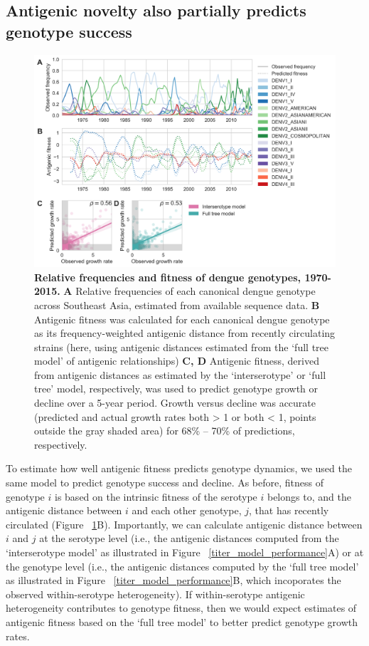\documentclass[11pt,oneside,letterpaper]{article}
\begin{document}
\subsection{Antigenic novelty also partially predicts genotype success}
\begin{figure}[h]
  \begin{centering}
\includegraphics[width=\linewidth]{../figures/png/genotype-fitness.png}
    \caption{\textbf{Relative frequencies and fitness of dengue genotypes, 1970-2015.}  \textbf{A} Relative frequencies of each canonical dengue genotype across Southeast Asia, estimated from available sequence data. \textbf{B} Antigenic fitness was calculated for each canonical dengue genotype as its frequency-weighted antigenic distance from recently circulating strains (here, using antigenic distances estimated from the `full tree model' of antigenic relationships) \textbf{C, D}  Antigenic fitness, derived from antigenic distances as estimated by the `interserotype' or `full tree' model, respectively, was used to predict genotype growth or decline over a 5-year period. Growth versus decline was accurate (predicted and actual growth rates both > 1 or both < 1, points outside the gray shaded area) for 68\% -- 70\% of predictions, respectively.
}
     \label{genotype_fitness}
   \end{centering}
\end{figure}

To estimate how well antigenic fitness predicts genotype dynamics, we used the same model to predict genotype success and decline.
As before, fitness of genotype $i$ is based on the intrinsic fitness of the serotype $i$ belongs to, and the antigenic distance between $i$ and each other genotype, $j$, that has recently circulated (Figure ~\ref{genotype_fitness}B).
Importantly, we can calculate antigenic distance between $i$ and $j$ at the serotype level (i.e., the antigenic distances computed from the `interserotype model' as illustrated in Figure ~\ref{titer_model_performance}A) or at the genotype level (i.e., the antigenic distances computed by the `full tree model' as illustrated in Figure ~\ref{titer_model_performance}B, which incoporates the observed within-serotype heterogeneity).
If within-serotype antigenic heterogeneity contributes to genotype fitness, then we would expect estimates of antigenic fitness based on the `full tree model' to better predict genotype growth rates.
\end{document}

